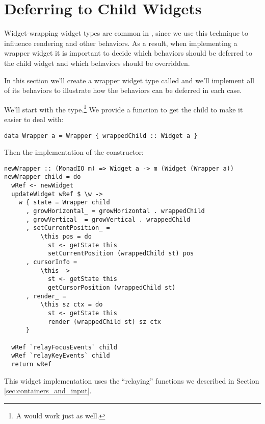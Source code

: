 \section{Deferring to Child Widgets}

Widget-wrapping widget types are common in , since we use
this technique to influence rendering and other behaviors.  As a
result, when implementing a wrapper widget it is important to decide
which behaviors should be deferred to the child widget and which
behaviors should be overridden.

In this section we'll create a wrapper widget type called 
and we'll implement all of its behaviors to illustrate how the
behaviors can be deferred in each case.

We'll start with the type.\footnote{A  would work just as
  well.}  We provide a function to get the child to make it easier to
deal with:

\begin{verbatim}
data Wrapper a = Wrapper { wrappedChild :: Widget a }
\end{verbatim}

Then the implementation of the constructor:

\begin{verbatim}
newWrapper :: (MonadIO m) => Widget a -> m (Widget (Wrapper a))
newWrapper child = do
  wRef <- newWidget
  updateWidget wRef $ \w ->
    w { state = Wrapper child
      , growHorizontal_ = growHorizontal . wrappedChild
      , growVertical_ = growVertical . wrappedChild
      , setCurrentPosition_ =
          \this pos = do
            st <- getState this
            setCurrentPosition (wrappedChild st) pos
      , cursorInfo =
          \this ->
            st <- getState this
            getCursorPosition (wrappedChild st)
      , render_ =
          \this sz ctx = do
            st <- getState this
            render (wrappedChild st) sz ctx
      }

  wRef `relayFocusEvents` child
  wRef `relayKeyEvents` child
  return wRef
\end{verbatim}

This widget implementation uses the ``relaying'' functions we
described in Section \ref{sec:containers_and_input}.
